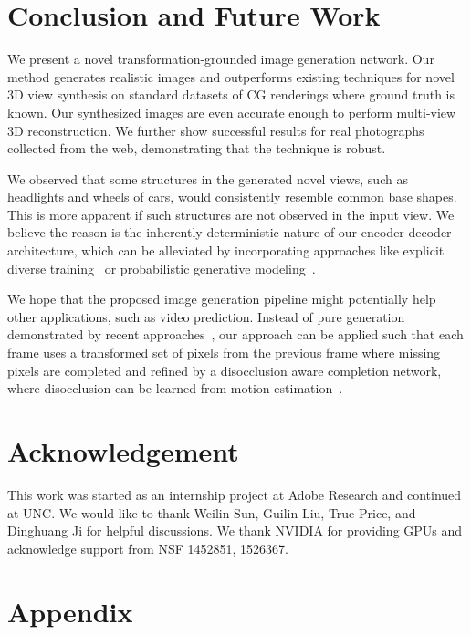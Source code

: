 \documentclass[10pt,twocolumn,letterpaper]{article}
\begin{document}
\section{Conclusion and Future Work}
We present a novel transformation-grounded image generation network. Our method generates realistic images and outperforms existing techniques for novel 3D view synthesis on standard datasets of CG renderings where ground truth is known. Our synthesized images are even accurate enough to perform multi-view 3D reconstruction.  We further show successful results for real photographs collected from the web, demonstrating that the technique is robust.

We observed that some structures in the generated novel views, such as headlights and wheels of cars, would consistently resemble common base shapes. This is more apparent if such structures are not observed in the input view. We believe the reason is the inherently deterministic nature of our encoder-decoder architecture, which can be alleviated by incorporating approaches like explicit diverse training~\cite{lee_nips2016} or probabilistic generative modeling~\cite{Xue_nips2016,Yan_eccv2016,mizra_arxiv2014,walker_eccv2016}.

We hope that the proposed image generation pipeline might potentially help other applications, such as video prediction. Instead of pure generation demonstrated by recent approaches~\cite{mathieu_iclr2016,Vondrick_nips2016}, our approach can be applied such that each frame uses a transformed set of pixels from the previous frame\cite{walker_eccv2016,dfn_NIPS2016,finn_NIPS2016} where missing pixels are completed and refined by a disocclusion aware completion network, where disocclusion can be learned from motion estimation~\cite{walker_eccv2016,finn_NIPS2016}.

\section*{Acknowledgement}
This work was started as an internship project at Adobe Research and continued at UNC. We would like to thank Weilin Sun, Guilin Liu, True Price, and Dinghuang Ji for helpful discussions. We thank NVIDIA for providing GPUs and acknowledge support from NSF 1452851, 1526367.

{\small


}




\newpage
\clearpage
\appendix

\section*{Appendix}
\end{document}
